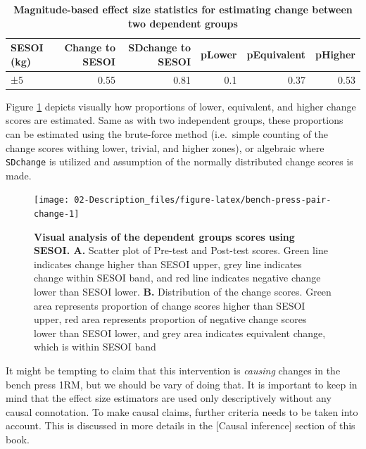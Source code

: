 \documentclass[
]{book}
\begin{document}
\begin{table}

\caption{\label{tab:change-MB-stats}\textbf{Magnitude-based effect size statistics for estimating change between two dependent groups}}
\centering
\begin{tabular}[t]{lrrrrr}
\toprule
SESOI (kg) & Change to SESOI & SDchange to SESOI & pLower & pEquivalent & pHigher\\
\midrule
±5 & 0.55 & 0.81 & 0.1 & 0.37 & 0.53\\
\bottomrule
\end{tabular}
\end{table}

Figure \ref{fig:bench-press-pair-change} depicts visually how proportions of lower, equivalent, and higher change scores are estimated. Same as with two independent groups, these proportions can be estimated using the brute-force method (i.e.~simple counting of the change scores withing lower, trivial, and higher zones), or algebraic where \texttt{SDchange} is utilized and assumption of the normally distributed change scores is made.

\begin{figure}

{\centering \texttt{[image: 02-Description\_files/figure-latex/bench-press-pair-change-1]} 

}

\caption{\textbf{Visual analysis of the dependent groups scores using SESOI. A. }Scatter plot of Pre-test and Post-test scores. Green line indicates change higher than SESOI upper, grey line indicates change within SESOI band, and red line indicates negative change lower than SESOI lower. \textbf{B.} Distribution of the change scores. Green area represents proportion of change scores higher than SESOI upper, red area represents proportion of negative change scores lower than SESOI lower, and grey area indicates equivalent change, which is within SESOI band}\label{fig:bench-press-pair-change}
\end{figure}



It might be tempting to claim that this intervention is \emph{causing} changes in the bench press 1RM, but we should be vary of doing that. It is important to keep in mind that the effect size estimators are used only descriptively without any causal connotation. To make causal claims, further criteria needs to be taken into account. This is discussed in more details in the {[}Causal inference{]} section of this book.
\end{document}
